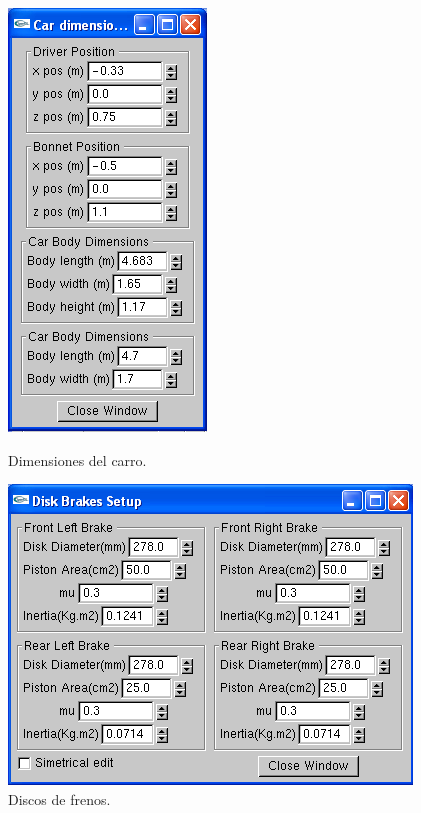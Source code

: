 \begin{figure}[h]
\vspace*{2 mm}
\begin{minipage}[b]{0.5\linewidth}
\centering
\includegraphics[scale= 0.5,type=png,ext=.png,read=.png]{figures/c11}
\caption{Dimensiones del carro.}
\label{fig:c11}
\end{minipage}
\begin{minipage}[b]{0.5\linewidth}
\centering
\includegraphics[scale= 0.5,type=png,ext=.png,read=.png]{figures/c8}
\caption{Discos de frenos.}
\label{fig:c8}
\end{minipage}
\end{figure} 

